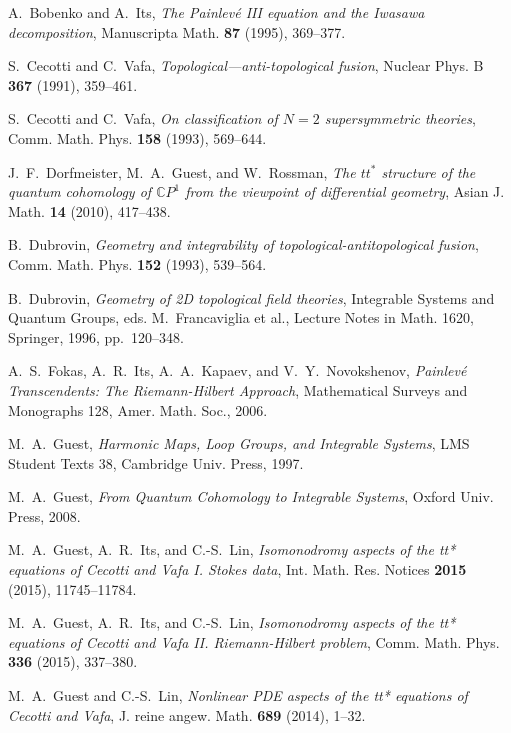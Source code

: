 \documentclass[a4paper,12pt,leqno]{amsart}
\numberwithin{equation}{section}
\theoremstyle{plain}
\theoremstyle{definition}
\newcommand{\C}{\mathbb C}
\begin{document}
{\begin{thebibliography}{99}
A.~Bobenko and A.~Its, 
\emph{The Painlev\'e III equation and the Iwasawa decomposition},
Manuscripta Math.
\textbf{87}
(1995),
369--377.

S.~Cecotti and C.~Vafa,
\emph{Topological---anti-topological fusion},
Nuclear Phys. B 
\textbf{367}
(1991),
359--461.

S.~Cecotti and C.~Vafa,
\emph{On classification of $N=2$ supersymmetric theories},
Comm. Math. Phys.
\textbf{158}
(1993),
569--644.

J.~F.~Dorfmeister, M.~A.~Guest, and W.~Rossman,
\emph{The $tt^\ast$ structure of the quantum cohomology of $\C P^1$ from the viewpoint of differential geometry},
Asian J. Math.
\textbf{14}
(2010),
417--438.

B.~Dubrovin,
\emph{Geometry and integrability of 
topological-antitopological fusion},
Comm. Math. Phys.
\textbf{152}
(1993),
539--564.

B.~Dubrovin,
\emph{Geometry of 2D topological field theories},
Integrable Systems and Quantum Groups,
eds. M.~Francaviglia et al.,
Lecture Notes in Math. 1620,
Springer,
1996,
pp.~120--348. 

A.~S.~Fokas, A.~R.~Its, A.~A.~Kapaev, and V.~Y.~Novokshenov,
\emph{Painlev\'e Transcendents: The Riemann-Hilbert Approach},
Mathematical Surveys and Monographs 128,
Amer. Math. Soc.,
2006.

M.~A.~Guest,
\emph{Harmonic Maps, Loop Groups, and Integrable Systems},
LMS Student Texts 38,
Cambridge Univ. Press,
1997.

M.~A.~Guest,  
\emph{From Quantum Cohomology to Integrable Systems},
Oxford Univ. Press,
2008.

M.~A.~Guest, A.~R.~Its, and C.-S.~Lin,
\emph{Isomonodromy aspects of the tt*
equations of Cecotti and Vafa I. Stokes data},
Int. Math. Res. Notices
\textbf{2015}
(2015),
11745--11784.

M.~A.~Guest, A.~R.~Its, and C.-S.~Lin,
\emph{Isomonodromy aspects of the tt*
equations of Cecotti and Vafa II. Riemann-Hilbert problem},
Comm. Math. Phys. 
\textbf{336}
(2015),
337--380.

M.~A.~Guest and C.-S.~Lin,
\emph{Nonlinear PDE aspects of the tt*
equations of Cecotti and Vafa},
J. reine angew. Math.
\textbf{689}
(2014),
1--32.


\end{thebibliography}}
\end{document}
